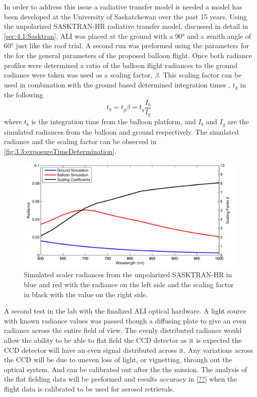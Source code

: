 In order to address this issue a radiative transfer model is needed a model has been developed at the University of Saskatchewan over the past 15 years. Using the unpolarized SASKTRAN-HR radiative transfer model, discussed in detail in \autoref{sec:4.1:Sasktran}, ALI was placed at the ground with a 90\si{\degree} and a zenith angle of 60\si{\degree} just like the roof trial. A second run was preformed using the parameters for the for the general parameters of the proposed balloon flight. Once both radiance profiles were determined a ratio of the balloon flight radiances to the ground radiance were taken was used as a scaling factor, $\beta$. This scaling factor can be used in combination with the ground based determined integration times , $t_{g}$  in the following
\begin{equation}
    t_{b} = t_{g}\beta = t_{g}\frac{I_{b}}{I_{g}}
\end{equation}
where $t_{b}$ is the integration time from the balloon platform, and $I_{b}$ and $I_{g}$ are the simulated radiances from the balloon and ground respectively. The simulated radiance and the scaling factor can be observed in \autoref{fig:3.3:exposureTimeDetermination}.

\begin{figure}
        \centering
        \includegraphics[width=1.0\textwidth]{./Images/3-3-ExposureTimeDetermination.pdf}
        \caption[Flight Exposure Time Determination]{Simulated scaler radiances from the unpolarized SASKTRAN-HR in blue and red with the radiance on the left side and the scaling factor in black with the value on the right side.}
        \label{fig:3.3:exposureTimeDetermination}
\end{figure}

A second test in the lab with the finalized ALI optical hardware. A light source with known radiance values was passed though a diffusing plate to give an even radiance across the entire field of view. The evenly distributed radiance would allow the ability to be able to flat field the CCD detector as it is expected the CCD detector will have an even signal distributed across it. Any variations across the CCD will be due to uneven loss of light, or vignetting, through out the optical system. And can be calibrated out after the the mission. The analysis of the flat fielding data will be preformed and results accuracy in \autoref{??} when the flight data is calibrated to be used for aerosol retrievals.

